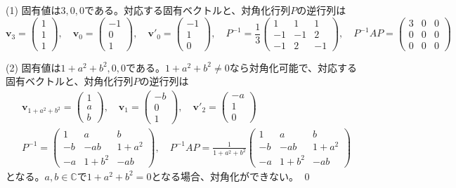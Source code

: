  (1) 固有値は$3, 0, 0$である。対応する固有ベクトルと、対角化行列$P$の逆行列は
\[
\bm{v}_3 = 
\begin{pmatrix}
1 \\
1 \\
1
\end{pmatrix}, \quad
\bm{v}_0 = 
\begin{pmatrix}
-1 \\
0 \\
1
\end{pmatrix}, \quad
\bm{v}'_0 = 
\begin{pmatrix}
-1 \\
1 \\
0
\end{pmatrix}, \quad
P^{-1} = 
\frac{1}{3}
\begin{pmatrix}
1 & 1 & 1 \\
-1 & -1 & 2 \\
-1 & 2 & -1
\end{pmatrix}, \quad
P^{-1} AP =
\begin{pmatrix}
3 & 0 & 0 \\
0 & 0 & 0 \\
0 & 0 & 0
\end{pmatrix}
\]

\noindent (2) 固有値は$1 + a^2 + b^2, 0, 0$である。$1 + a^2 + b^2 \neq 0$なら対角化可能で、対応する固有ベクトルと、対角化行列$P$の逆行列は
\begin{align*}
& \bm{v}_{1 + a^2 + b^2} = 
\begin{pmatrix}
1 \\
a \\
b
\end{pmatrix}, \quad
\bm{v}_1 = 
\begin{pmatrix}
-b \\
0 \\
1
\end{pmatrix}, \quad
\bm{v}'_2 = 
\begin{pmatrix}
-a \\
1 \\
0
\end{pmatrix} \\
& P^{-1} = 
\begin{pmatrix}
1 & a & b \\
-b & -ab & 1 + a^2 \\
-a & 1 + b^2 & -ab
\end{pmatrix}, \quad
P^{-1} AP =
\frac{1}{1 + a^2 + b^2}
\begin{pmatrix}
1 & a & b \\
-b & -ab & 1 + a^2 \\
-a & 1 + b^2 & -ab
\end{pmatrix}
\end{align*}
となる。$a, b \in \mathbb{C}$で$1 + a^2 + b^2 = 0$となる場合、対角化ができない。 \qed

